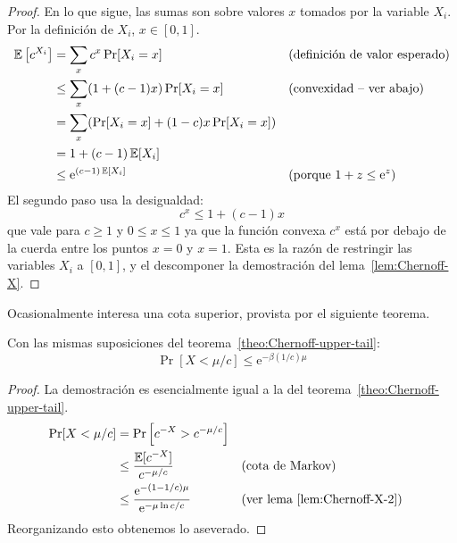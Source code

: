   \begin{proof}
    En lo que sigue,
    las sumas son sobre valores \(x\) tomados por la variable \(X_i\).
    Por la definición de \(X_i\),
    \(x \in [0, 1]\).
    \begin{align*}
      \operatorname{\mathbb{E}}\left[ c^{X_i} \right]
        &=   \sum_x c^x \Pr[X_i = x]
                && \text{(definición de valor esperado)} \\
        &\le \sum_x (1 + (c - 1) x) \Pr[X_i = x]
                && \text{(convexidad -- ver abajo)} \\
        &=   \sum_x ( \Pr[X_i = x] + (1 - c) x \Pr[X_i = x] ) \\
        &=   1 + (c - 1) \operatorname{\mathbb{E}}[X_i] \\
        &\le \mathrm{e}^{(c - 1) \operatorname{\mathbb{E}}[X_i]}
                && \text{(porque \(1 + z \le \mathrm{e}^z\))}
    \end{align*}
    El segundo paso usa la desigualdad:
    \begin{equation*}
      c^x
        \le 1 + (c - 1) x
    \end{equation*}
    que vale para \(c \ge 1\) y \(0 \le x \le 1\)
    ya que la función convexa \(c^x\)
    está por debajo de la cuerda entre los puntos \(x = 0\) y \(x = 1\).
    Esta es la razón de restringir las variables \(X_i\) a \([0, 1]\),
    y el descomponer
    la demostración del lema~\ref{lem:Chernoff-X}.
  \end{proof}
  Ocasionalmente interesa una cota superior,
  provista por el siguiente teorema.
  \begin{theorem}
    \label{theo:Chernoff-lower-tail}
    Con las mismas suposiciones del teorema~\ref{theo:Chernoff-upper-tail}:
    \begin{equation}
      \label{eq:Chernoff-lower-tail}
      \Pr[X < \mu / c]
        \le \mathrm{e}^{- \beta(1 / c) \mu}
    \end{equation}
  \end{theorem}
  \begin{proof}
    La demostración es esencialmente igual
    a la del teorema~\ref{theo:Chernoff-upper-tail}.
    \begin{align*}
      \Pr[X < \mu / c]
        &=   \Pr\left[ c^{-X} > c^{- \mu / c} \right] \\
        &\le \frac{\operatorname{\mathbb{E}}[c^{- X}]}{c^{- \mu / c}}
                && \text{(cota de Markov)} \\
        &\le \frac{\mathrm{e}^{-(1 - 1/c) \mu}}{\mathrm{e}^{- \mu \ln c / c}}
                && \text{(ver lema~\ref{lem:Chernoff-X-2})}
    \end{align*}
    Reorganizando esto obtenemos lo aseverado.
  \end{proof}
